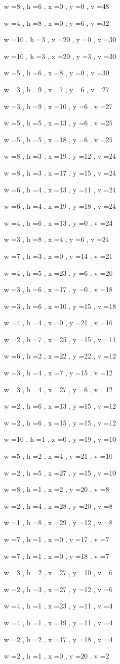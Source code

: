 \documentclass[11pt]{article}
\begin{document}
w =8 , h =6 , x =0 , y =0 , v =48
\par
w =4 , h =8 , x =0 , y =6 , v =32
\par
w =10 , h =3 , x =20 , y =0 , v =30
\par
w =10 , h =3 , x =20 , y =3 , v =30
\par
w =5 , h =6 , x =8 , y =0 , v =30
\par
w =3 , h =9 , x =7 , y =6 , v =27
\par
w =3 , h =9 , x =10 , y =6 , v =27
\par
w =5 , h =5 , x =13 , y =6 , v =25
\par
w =5 , h =5 , x =18 , y =6 , v =25
\par
w =8 , h =3 , x =19 , y =12 , v =24
\par
w =8 , h =3 , x =17 , y =15 , v =24
\par
w =6 , h =4 , x =13 , y =11 , v =24
\par
w =6 , h =4 , x =19 , y =18 , v =24
\par
w =4 , h =6 , x =13 , y =0 , v =24
\par
w =3 , h =8 , x =4 , y =6 , v =24
\par
w =7 , h =3 , x =0 , y =14 , v =21
\par
w =4 , h =5 , x =23 , y =6 , v =20
\par
w =3 , h =6 , x =17 , y =0 , v =18
\par
w =3 , h =6 , x =10 , y =15 , v =18
\par
w =4 , h =4 , x =0 , y =21 , v =16
\par
w =2 , h =7 , x =25 , y =15 , v =14
\par
w =6 , h =2 , x =22 , y =22 , v =12
\par
w =3 , h =4 , x =7 , y =15 , v =12
\par
w =3 , h =4 , x =27 , y =6 , v =12
\par
w =2 , h =6 , x =13 , y =15 , v =12
\par
w =2 , h =6 , x =15 , y =15 , v =12
\par
w =10 , h =1 , x =0 , y =19 , v =10
\par
w =5 , h =2 , x =4 , y =21 , v =10
\par
w =2 , h =5 , x =27 , y =15 , v =10
\par
w =8 , h =1 , x =2 , y =20 , v =8
\par
w =2 , h =4 , x =28 , y =20 , v =8
\par
w =1 , h =8 , x =29 , y =12 , v =8
\par
w =7 , h =1 , x =0 , y =17 , v =7
\par
w =7 , h =1 , x =0 , y =18 , v =7
\par
w =3 , h =2 , x =27 , y =10 , v =6
\par
w =2 , h =3 , x =27 , y =12 , v =6
\par
w =4 , h =1 , x =23 , y =11 , v =4
\par
w =4 , h =1 , x =19 , y =11 , v =4
\par
w =2 , h =2 , x =17 , y =18 , v =4
\par
w =2 , h =1 , x =0 , y =20 , v =2
\par
\newpage
\end{document}
